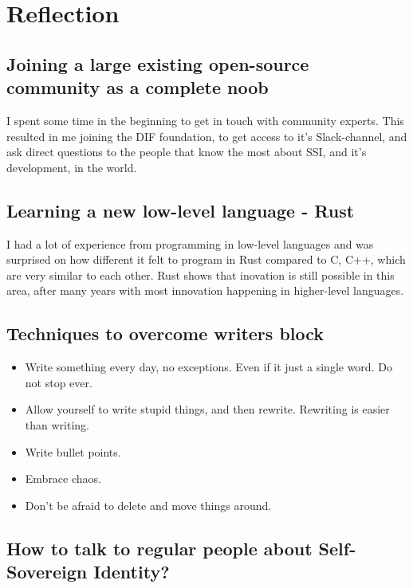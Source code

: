 \chapter{Reflection}

\section{Joining a large existing open-source community as a complete noob}

I spent some time in the beginning to get in touch with community experts. This resulted in me joining the DIF foundation, to get access to it's Slack-channel, and ask direct questions to the people that know the most about SSI, and it's development, in the world.

\section{Learning a new low-level language - Rust}

I had a lot of experience from programming in low-level languages and was surprised on how different it felt to program in Rust compared to C, C++, which are very similar to each other. Rust shows that inovation is still possible in this area, after many years with most innovation happening in higher-level languages.

\section{Techniques to overcome writers block}
\begin{itemize}
    \item Write something every day, no exceptions. Even if it just a single word. Do not stop ever.
    \item Allow yourself to write stupid things, and then rewrite. Rewriting is easier than writing.
    \item Write bullet points.
    \item Embrace chaos.
    \item Don't be afraid to delete and move things around.
\end{itemize}



\newpage

\section{How to talk to regular people about Self-Sovereign Identity?}

